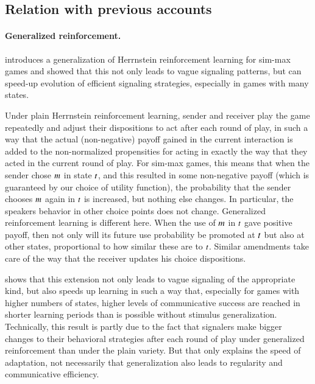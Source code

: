 \subsection{Relation with previous accounts}

\paragraph{Generalized reinforcement.}
\citet{OConnor2013:The-Evolution-o} introduces a generalization of
Herrnstein reinforcement learning for sim-max games and showed that
this not only leads to vague signaling patterns, but can speed-up
evolution of efficient signaling strategies, especially in games with
many states. 

Under plain Herrnstein reinforcement learning, sender and receiver
play the game repeatedly and adjust their dispositions to act after
each round of play, in such a way that the actual (non-negative)
payoff gained in the current interaction is added to the
non-normalized propensities for acting in exactly the way that they
acted in the current round of play. For sim-max games, this means that
when the sender chose $m$ in state $t$, and this resulted in
some non-negative payoff (which is guaranteed by our choice of utility
function), the probability that the sender chooses $m$ again in
$t$ is increased, but nothing else changes. In particular, the
speakers behavior in other choice points does not change. Generalized
reinforcement learning is different here. When the use of $m$ in
$t$ gave positive payoff, then not only will its future use
probability be promoted at $t$ but also at other states,
proportional to how similar these are to $t$. Similar amendments
take care of the way that the receiver updates his choice
dispositions.

\citet{OConnor2013:The-Evolution-o} shows that this extension not only
leads to vague signaling of the appropriate kind, but also speeds up
learning in such a way that, especially for games with higher numbers
of states, higher levels of communicative success are reached in
shorter learning periods than is possible without stimulus
generalization. Technically, this result is partly due to the fact
that signalers make bigger changes to their behavioral strategies
after each round of play under generalized reinforcement than under
the plain variety. But that only explains the speed of adaptation, not
necessarily that generalization also leads to regularity and
communicative efficiency. 

